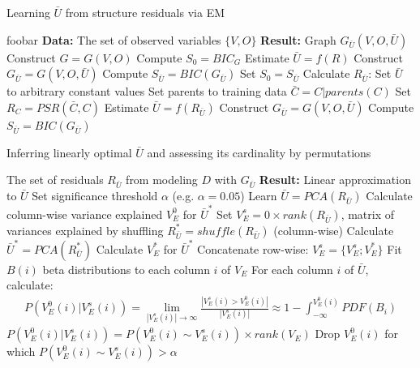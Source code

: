 \documentclass{article}
\begin{document}
\begin{algorithm}%
 \caption{Learning $\bar{U}$ from structure residuals via EM}
 \label{alg:latentEM}
\begin{algorithmic}
 \STATE foobar
 \STATE \textbf{Data:} The set of observed variables $\{V, O\}$
 \STATE \textbf{Result:} Graph $G_{\bar{U}}(V, O, \bar{U})$
 \STATE Construct $G = G(V, O)$\;
 \STATE Compute $S_0 = BIC_{G}$\;
 \STATE Estimate $\bar{U} = f(R)$\;
 \STATE Construct $G_{\bar{U}} = G(V, O, \bar{U})$\;
 \STATE Compute $S_{\bar{U}} = BIC(G_{\bar{U}})$\;
  \STATE Set $S_0 = S_{\bar{U}}$\;
  \STATE Calculate $R_{\bar{U}}$:\;
  \STATE Set $\bar{U}$ to arbitrary constant values\;
  	\STATE Set parents to training data\;
  	\STATE $\bar{C} = C|parents(C)$\;
  	\STATE Set $R_C = PSR(\bar{C}, C)$\;
  \ENDFOR
  \STATE Estimate $\bar{U} = f(R_{\bar{U}})$\;
  \STATE Construct $G_{\bar{U}} = G(V, O, \bar{U})$\;
  \STATE Compute $S_{\bar{U}} = BIC(G_{\bar{U}})$\;
 \ENDWHILE
\end{algorithmic}
\end{algorithm}
\hspace{1cm}
\begin{algorithm}%
 \caption{Inferring linearly optimal $\bar{U}$ and assessing its cardinality by permutations}
 \label{alg:linearPCA}
\begin{algorithmic}
 The set of residuals $R_{\bar{U}}$ from modeling $D$ with $G_{\bar{U}}$
\STATE \textbf{Result:} Linear approximation to $\bar{U}$
 \STATE Set significance threshold $\alpha$ (e.g. $\alpha = 0.05$)\;
 \STATE Learn $\bar{U} = PCA(R_{\bar{U}})$\;
 \STATE Calculate column-wise variance explained $V_E^{0}$ for $\bar{U}^{*}$\;
 \STATE Set $V_E^s = 0 \times rank(R_{\bar{U}})$, matrix of variances explained by shuffling\;
  \STATE $R_{\bar{U}}^{*} = shuffle(R_{\bar{U}})$ (column-wise)\;
  \STATE Calculate $\bar{U}^{*} = PCA(R_{\bar{U}}^{*})$\;
  \STATE Calculate $V_E^{*}$ for $\bar{U}^{*}$\;
  \STATE Concatenate row-wise: $V_E^s = \{V_E^s; V_E^{*}\}$\;
  \STATE Fit $B(i)$ beta distributions to each column $i$ of $V_E$\;
  \STATE For each column $i$ of $\bar{U}$, calculate:\;
  \begin{gather*}
  P(V_E^{0}(i) | V_E^s(i)) = \lim_{|V_E^s(i)| \to \infty} \frac{|V_E^s(i) > V_E^{0}(i)|}{|V_E^s(i)|} \approx 1 - \int_{-\infty}^{V_E^{0}(i)} PDF(B_i)
  \end{gather*}\;
 \ENDWHILE
 \STATE $P(V_E^{0}(i) | V_E^s(i)) = P(V_E^{0}(i) \sim V_E^s(i)) \times rank(V_E)$\;
 \STATE Drop $V_E^{0}(i)$ for which $P(V_E^{0}(i) \sim V_E^s(i)) > \alpha$
\end{algorithmic}
\end{algorithm}
\end{document}
